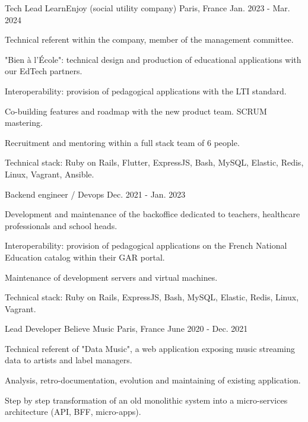 \begin{cventries}
  \cventry
    {Tech Lead}
    {LearnEnjoy (social utility company)}
    {Paris, France}
    {Jan. 2023 - Mar. 2024}
    {
      \begin{cvitems}
        \item {Technical referent within the company, member of the management committee.}
        \item {"Bien à l'École": technical design and production of educational applications with our EdTech partners.}
        \item {Interoperability: provision of pedagogical applications with the LTI standard.}
        \item {Co-building features and roadmap with the new product team. SCRUM mastering.}
        \item {Recruitment and mentoring within a full stack team of 6 people.}
        \item {Technical stack: Ruby on Rails, Flutter, ExpressJS, Bash, MySQL, Elastic, Redis, Linux, Vagrant, Ansible.}
      \end{cvitems}
      \vspace{-2.0mm}
    }
  \cventry
    {Backend engineer / Devops}
    {}
    {}
    {Dec. 2021 - Jan. 2023}
    {
      \begin{cvitems}
        \item {Development and maintenance of the backoffice dedicated to teachers, healthcare professionals and school heads.}
        \item {Interoperability: provision of pedagogical applications on the French National Education catalog within their GAR portal.}
        \item {Maintenance of development servers and virtual machines.}
        \item {Technical stack: Ruby on Rails, ExpressJS, Bash, MySQL, Elastic, Redis, Linux, Vagrant.}
      \end{cvitems}
    }
  \cventry
    {Lead Developer}
    {Believe Music}
    {Paris, France}
    {June 2020 - Dec. 2021}
    {
      \begin{cvitems}
        \item {Technical referent of "Data Music", a web application exposing music streaming data to artists and label managers.}
        \item {Analysis, retro-documentation, evolution and maintaining of existing application.}
        \item {Step by step transformation of an old monolithic system into a micro-services architecture (API, BFF, micro-apps).}

\end{cvitems}}
\end{cventries}
